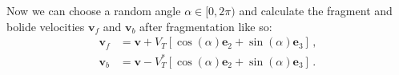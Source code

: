 Now we can choose a random angle $\alpha \in [0, 2\pi)$ and calculate the fragment and bolide velocities $\pmb{v}_f$ and $\pmb{v}_b$ after fragmentation like so:
\begin{align}
    \pmb{v}_f &= \pmb{v} + V_T[\cos(\alpha)\pmb{e}_2 + \sin(\alpha)\pmb{e}_3]\,,\\
    \pmb{v}_b &= \pmb{v} - V_T^*[\cos(\alpha)\pmb{e}_2 + \sin(\alpha)\pmb{e}_3]\,.
\end{align}
